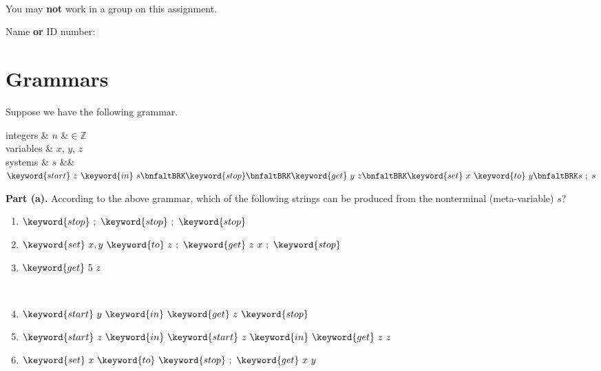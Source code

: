 
\gdef\lecturenumber{a1}
\gdef\subsectioncounters{1}




\date{due: Thursday, 2022--07--09, 11:59 pm}

~\\[-7ex]

{\noindent You} may \textbf{not} work in a group on this assignment.

\medskip

{\noindent Name} \textbf{or} ID number:\hspace*{220pt}



\vspace*{1ex}





\section{Grammars}

Suppose we have the following grammar.

\begin{grammar}
  integers
  &
  $n$
  &$\in \mathbb{Z}$
\\
  variables
  &
  $x$, $y$, $z$
\\
  systems
  &
  $s$ 
  &\bnfas&
  $
  \keyword{start}~z~\keyword{in}~s
  \bnfaltBRK
  \keyword{stop}
  \bnfaltBRK
  \keyword{get}~y~z
  \bnfaltBRK
  \keyword{set}~x~\keyword{to}~y
  \bnfaltBRK
  s~;~s
  $
\end{grammar}

\textbf{Part (a).} According to the above grammar, which of the following strings can be produced from the
nonterminal (meta-variable) $s$?  

\begin{minipage}[t]{0.47\linewidth}
\begin{enumerate}
\item $\keyword{stop}~;~\keyword{stop}~;~\keyword{stop}$
\item $\keyword{set}~x, y~\keyword{to}~z~;~\keyword{get}~z~x~;~\keyword{stop}$
\item $\keyword{get}~5~z$
\end{enumerate}
\end{minipage}
~
\begin{minipage}[t]{0.47\linewidth}
\begin{enumerate}
  \setcounter{enumi}{3}
\item $\keyword{start}~y~\keyword{in}~\keyword{get}~z~\keyword{stop}$
\item $\keyword{start}~z~\keyword{in}~\keyword{start}~z~\keyword{in}~\keyword{get}~z~z$
\item $\keyword{set}~x~\keyword{to}~\keyword{stop}~;~\keyword{get}~x~y$
\end{enumerate}
\end{minipage}

